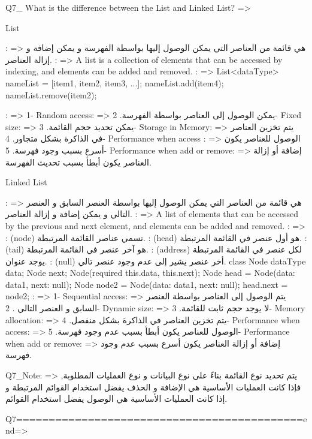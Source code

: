 Q7_ What is the difference between the List and Linked List? =>{                          
    List{
        \Arabic: => هي قائمة من العناصر التي يمكن الوصول إليها بواسطة الفهرسة و يمكن إضافة و إزالة العناصر.
        \English: => A list is a collection of elements that can be accessed by indexing, and elements can be added and removed.
        \code: => {
                List<dataType> nameList = [item1, item2, item3, ...];
                nameList.add(item4);
                nameList.remove(item2);
        }

        \Features: => {
            1- Random access: => يمكن الوصول إلى العناصر بواسطة الفهرسة.
            2- Fixed size: => يمكن تحديد حجم القائمة.
            3- Storage in Memory: => يتم تخزين العناصر في الذاكرة بشكل متجاور. 
            4- Performance when access : => الوصول للعناصر يكون أسرع بسبب وجود فهرسة.
            5- Performance when add or remove: => إضافة أو إزالة العناصر يكون أبطأ بسبب تحديث الفهرسة.
        }
    }
    Linked List {
        \Arabic: => هي قائمة من العناصر التي يمكن الوصول إليها بواسطة العنصر السابق و العنصر التالي و يمكن إضافة و إزالة العناصر.
        \English: => A list of elements that can be accessed by the previous and next element, and elements can be added and removed.
        \code: =>{
            \note\1: (node)  تسمي عناصر القائمة المرتبطة.
            \note\2: (head) هو أول عنصر في القائمة المرتبطة. 
            \note\3: (tail) هو آخر عنصر في القائمة المرتبطة.
            \note\4: (address) لكل عنصر في القائمة المرتبطة يوجد عنوان.
            \note\5: (null) أخر عنصر يشير إلى عدم وجود عنصر تالي. 
            class Node {
                dataType data;
                Node next;
                Node({required this.data, this.next});
            }
            Node head = Node({data: data1, next: null});
            Node node2 = Node({data: data1, next: null});
            head.next = node2;
        }
        \Features: => {
            1- Sequential access: => يتم الوصول إلى العناصر بواسطة العنصر السابق و العنصر التالي .
            2- Dynamic size: => لا يوجد حجم ثابت للقائمة.
            3- Memory allocation: => يتم تخزين العناصر في الذاكرة بشكل منفصل.
            4- Performance when access: => الوصول للعناصر يكون أبطأ بسبب عدم وجود فهرسة.
            5- Performance when add or remove: => إضافة أو إزالة العناصر يكون أسرع بسبب عدم وجود فهرسة.
        }

        Q7_Note: => يتم تحديد نوع القائمة بناءً على نوع البيانات و نوع العمليات المطلوبة, فإذا كانت العمليات الأساسية هي الإضافة و الحذف يفضل استخدام القوائم المرتبطة و إذا كانت العمليات الأساسية هي الوصول يفضل استخدام القوائم. 
    }   

}     
                            Q7============================================end=>
